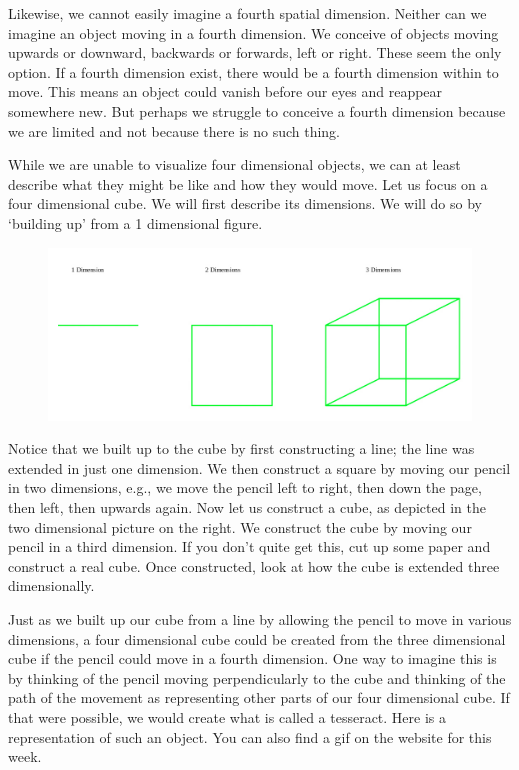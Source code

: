 \documentclass[oneside]{article}
\begin{document}
Likewise, we cannot easily imagine a fourth spatial dimension. Neither can we imagine an object moving in a fourth dimension. We conceive of objects moving upwards or downward, backwards or forwards, left or right. These seem the only option. If a fourth dimension exist, there would be a fourth dimension within to move. This means an object could vanish before our eyes and reappear somewhere new. But perhaps we struggle to conceive a fourth dimension because we are limited and not because there is no such thing. 

While we are unable to  visualize four dimensional objects, we can at least describe what they might be like and how they would move. Let us focus on a four dimensional cube. We will first describe its dimensions. We will do so by `building up' from a 1 dimensional figure. 

\begin{figure}[h]
  \includegraphics[width=\linewidth]{dimensions.jpg}
\end{figure}


Notice that we built up to the cube by first constructing a line; the line was extended in just one dimension. We then construct a square by moving our pencil in two dimensions, e.g., we move the pencil left to right, then down the page, then left, then upwards again. Now let us construct a cube, as depicted in the two dimensional picture on the right. We construct the cube by moving our pencil in a third dimension. If you don't quite get this, cut up some paper and construct a real cube. Once constructed, look at how the cube is extended three dimensionally. 

Just as we built up our cube from a line by allowing the pencil to move in various dimensions, a four dimensional cube could be created from the three dimensional cube if the pencil could move in a fourth dimension. One way to imagine this is by thinking of the pencil moving perpendicularly to the cube and thinking of the path of the movement as representing other parts of our four dimensional cube. If that were possible, we would create what is called a tesseract. Here is a representation of such an object. You can also find a gif on the website for this week.
\end{document}
